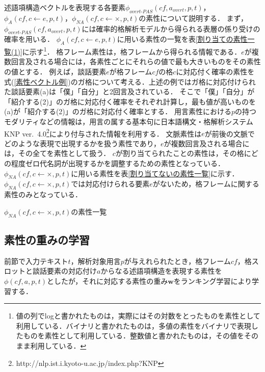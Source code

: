 \documentclass[japanese]{jnlp_1.4}
\begin{document}
述語項構造ベクトルを表現する各要素$\phi_{\textit{overt-PAS}}(\mathit{cf},a_\mathit{overt},p,t)$，$\phi_{A}(\mathit{cf},c \leftarrow e,p,t)$，$\phi_\mathit{NA}(\mathit{cf},c \leftarrow ×,p,t)$の素性について説明する．
まず，$\phi_{\textit{overt-PAS}}(\mathit{cf},a_\mathit{overt},p,t)$には確率的格解析モデル\cite{河原大輔:2007-07-10}から得られる表層の係り受けの確率を用いる．
$\phi_{A}(\mathit{cf},c \leftarrow e,p,t)$に用いる素性の一覧を表\ref{割り当ての素性一覧(1)}に示す\footnote{値の列でlogと書かれたものは，実際にはその対数をとったものを素性として利用している．バイナリと書かれたものは，多値の素性をバイナリで表現したものを素性として利用している．整数値と書かれたものは，その値をそのまま利用している．}．
格フレーム素性は，格フレームから得られる情報である．$e$が複数回言及される場合には，各素性ごとにそれらの値で最も大きいものをその素性の値とする．
例えば，談話要素$e$が格フレーム$\mathit{cf}$の格$c$に対応付く確率の素性を式(\ref{素性ベクトル例})のガ格について考える．上述の例ではガ格に対応付けられた談話要素(a)は「僕」「自分」と2回言及されている．
そこで「僕」「自分」が「紹介する(2)」のガ格に対応付く確率をそれぞれ計算し，最も値が高いものを(a)が「紹介する(2)」のガ格に対応付く確率とする．
用言素性における$p$の持つモダリティなどの情報は，用言の属する基本句に日本語構文・格解析システムKNP ver.~4.0\footnote{http://nlp.ist.i.kyoto-u.ac.jp/index.php?KNP}により付与された情報を利用する．
文脈素性は$e$が前後の文脈でどのような表現で出現するかを扱う素性であり，$e$が複数回言及される場合には，その全てを素性として扱う．
$c$が割り当てられたことの素性は，その格にどの程度ゼロ代名詞が出現するかを調整するための素性となっている．
$\phi_\mathit{NA}(\mathit{cf},c \leftarrow ×,p,t)$に用いる素性を表\ref{割り当てないの素性一覧}に示す．$\phi_\mathit{NA}(\mathit{cf},c \leftarrow ×,p,t)$では対応付けられる要素$e$がないため，格フレームに関する素性のみとなっている．


\begin{table}[t]
\caption{$\phi_\mathit{NA}(\mathit{cf},c \leftarrow ×,p,t)$の素性一覧}
\label{割り当てないの素性一覧}

\end{table}


\subsection{素性の重みの学習}
\label{素性の重みの学習}

前節で入力テキスト$t$，解析対象用言$p$が与えれられたとき，格フレーム$\mathit{cf}$，格スロットと談話要素の対応付け$a$からなる述語項構造を表現する素性を$\phi(\mathit{cf},a,p,t)$としたが，それに対応する素性の重み$\mathbf{w}$をランキング学習により学習する．
\end{document}
